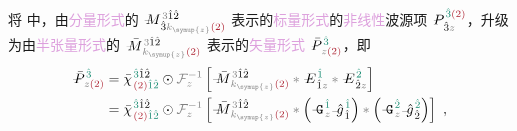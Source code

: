将  中，由\textcolor{Plum}{分量形式}的 $\Xint{\mathcolor{gray}{-}}{18}{M}^{\;\! \mathcolor{gray}{3} \hat{1} \hat{2} }_{\;\! \hat{3} \mathcolor{gray}{k_{\symup{z}}} \textcolor{Maroon}{(2)} }$ 表示的\textcolor{Plum}{标量形式}的\textcolor{Plum}{非线性}\textcolor{NavyBlue}{波源}项 $\Xint{\mathcolor{gray}{-}}{30}{P}^{\;\! \textcolor{PineGreen}{\hat{3}} \textcolor{Maroon}{(2)} }_{\;\! \hat{3}\mathcolor{gray}{z}}$，升级为由\textcolor{Plum}{半张量形式}的 $\Xint{\mathcolor{gray}{-}}{18}{\bar{M}}^{\;\! \mathcolor{gray}{3} \hat{1} \hat{2} }_{\;\! \mathcolor{gray}{k_{\symup{z}}} \textcolor{Maroon}{(2)} }$ 表示的\textcolor{Plum}{矢量形式} $\Xint{\mathcolor{gray}{-}}{30}{\bar{P}}^{\;\! \textcolor{PineGreen}{\hat{3}} }_{\;\! \mathcolor{gray}{z} \textcolor{Maroon}{(2)} }$，即
\begin{subequations} \label{eq:DP^(2)-3_12-discrete-G}
\begin{align}
	\Xint{\mathcolor{gray}{-}}{30}{\bar{P}}^{\;\! \textcolor{PineGreen}{\hat{3}} }_{\;\! \mathcolor{gray}{z}  \textcolor{Maroon}{(2)}} &= \bar{\chi}^{\;\! \textcolor{PineGreen}{\hat{3}} \hat{1} \hat{2} }_{\;\! \textcolor{Maroon}{(2)} \textcolor{PineGreen}{\hat{1} \hat{2}}} \odot \mathcolor{gray}{\mathcal F_{z}^{-1}} \left[ \Xint{\mathcolor{gray}{-}}{18}{\bar{M}}^{\;\! \mathcolor{gray}{3} \hat{1} \hat{2} }_{\;\! \mathcolor{gray}{k_{\symup{z}}} \textcolor{Maroon}{(2)} } \mathcolor{gray}{*} \Xint{\mathcolor{gray}{-}}{295}{E}^{\;\! \textcolor{PineGreen}{\hat{1}}}_{\;\! \hat{1} \mathcolor{gray}{z}} \mathcolor{gray}{*} \Xint{\mathcolor{gray}{-}}{295}{E}^{\;\! \textcolor{PineGreen}{\hat{2}}}_{\;\! \hat{2} \mathcolor{gray}{z}} \right] \label{eq:DP^(2)-3_12-discrete-G1} \\
	&= \bar{\chi}^{\;\! \textcolor{PineGreen}{\hat{3}} \hat{1} \hat{2} }_{\;\! \textcolor{Maroon}{(2)} \textcolor{PineGreen}{\hat{1} \hat{2}}} \odot \mathcolor{gray}{\mathcal F_{z}^{-1}} \left[ \Xint{\mathcolor{gray}{-}}{18}{\bar{M}}^{\;\! \mathcolor{gray}{3} \hat{1} \hat{2} }_{\;\! \mathcolor{gray}{k_{\symup{z}}} \textcolor{Maroon}{(2)} } \mathcolor{gray}{*} \left( \Xint{\mathcolor{gray}{-}}{20}{\mathtt{G}}^{\;\! \textcolor{PineGreen}{\hat{1}}}_{\;\! \mathcolor{gray}{z}} \Xint{{}^{}_{\mathcolor{gray}{-}}}{10}{\hat{g}}^{\;\! \textcolor{PineGreen}{\hat{1}}}_{\;\! \hat{1}} \right) \mathcolor{gray}{*} \left( \Xint{\mathcolor{gray}{-}}{20}{\mathtt{G}}^{\;\! \textcolor{PineGreen}{\hat{2}}}_{\;\! \mathcolor{gray}{z}} \Xint{{}^{}_{\mathcolor{gray}{-}}}{10}{\hat{g}}^{\;\! \textcolor{PineGreen}{\hat{2}}}_{\;\! \hat{2}} \right) \right] ~, \label{eq:DP^(2)-3_12-discrete-G2}
\end{align}
\end{subequations}
